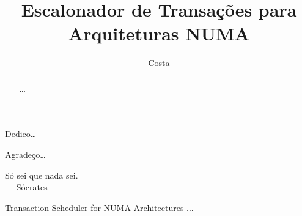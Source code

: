 \documentclass[diss,capa]{texufpel}
\title{Escalonador de Transações para Arquiteturas NUMA}
\author{Costa}{Michael Alexandre}
\begin{document}

\maketitle 

\sloppy

\fichacatalografica





\begin{dedicatoria}
  Dedico\ldots 
\end{dedicatoria}

\begin{agradecimentos}
  Agradeço\ldots 
\end{agradecimentos}

\begin{epigrafe}
  Só sei que nada sei.\\
  {\sc --- Sócrates}
\end{epigrafe}

\begin{abstract}
...
\end{abstract}

\begin{englishabstract}{Transaction Scheduler for NUMA Architectures}
...
\end{englishabstract}
\end{document}
